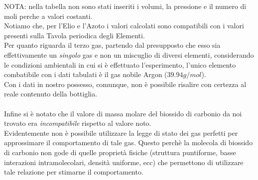 \documentclass[a4paper,11pt]{article}
\begin{document}
NOTA: nella tabella non sono stati inseriti i volumi, la pressione e il numero di moli perche a valori costanti.\\

Notiamo che, per l'Elio e l'Azoto i valori calcolati sono compatibili con i valori presenti sulla Tavola periodica degli Elementi. \\
Per quanto riguarda il terzo gas, partendo dal presupposto che esso sia effettivamente un \emph{singolo} gas e non un miscuglio di diversi elementi, considerando le condizioni ambientali in cui si è effettuato l'esperimento, l'unico elemento combatibile con i dati tabulati è il gas nobile Argon ($39.94g/mol$). \\ Con i dati in nostro possesso, comunque, non è possibile risalire con certezza al reale contenuto della bottiglia. 
\\
\\
Infine si è notato che il valore di massa molare del biossido di carbonio da noi trovato era \emph{incompatibile} rispetto al valore noto. \\
Evidentemente non è possibile utilizzare la legge di stato dei gas perfetti per approssimare il comportamento di tale gas. Questo perchè la molecola di biossido di carbonio non gode di quelle proprietà fisiche (struttura puntiforme, basse interazioni intramolecolari, densità uniforme, ecc) che permettono di utilizzare tale relazione per stimarne il comportamento.
\end{document}
